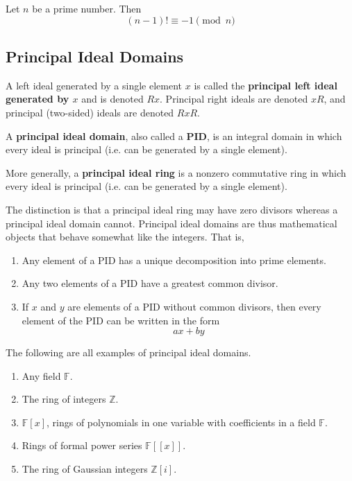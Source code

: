   \begin{theorem}
    Let $n$ be a prime number. Then 
    \begin{equation}
      (n-1)! \equiv -1 \pmod{n}
    \end{equation}
  \end{theorem}

\subsection{Principal Ideal Domains} 

  \begin{definition}
    A left ideal generated by a single element $x$ is called the \textbf{principal left ideal generated by $x$} and is denoted $R x$. Principal right ideals are denoted $x R$, and principal (two-sided) ideals are denoted $R x R$. 
  \end{definition}

  \begin{definition}
    A \textbf{principal ideal domain}, also called a \textbf{PID}, is an integral domain in which every ideal is principal (i.e. can be generated by a single element). 

    More generally, a \textbf{principal ideal ring} is a nonzero commutative ring in which every ideal is principal (i.e. can be generated by a single element). 
  \end{definition}

  The distinction is that a principal ideal ring may have zero divisors whereas a principal ideal domain cannot. Principal ideal domains are thus mathematical objects that behave somewhat like the integers. That is, 
  \begin{enumerate}
    \item Any element of a PID has a unique decomposition into prime elements. 
    \item Any two elements of a PID have a greatest common divisor. 
    \item If $x$ and $y$ are elements of a PID without common divisors, then every element of the PID can be written in the form 
      \begin{equation}
        a x + b y
      \end{equation}
  \end{enumerate}

  \begin{example}
    The following are all examples of principal ideal domains. 
    \begin{enumerate}
      \item Any field $\mathbb{F}$. 
      \item The ring of integers $\mathbb{Z}$. 
      \item $\mathbb{F}[x]$, rings of polynomials in one variable with coefficients in a field $\mathbb{F}$. 
      \item Rings of formal power series $\mathbb{F}[[x]]$. 
      \item The ring of Gaussian integers $\mathbb{Z}[i]$. 
    \end{enumerate}
  \end{example}

